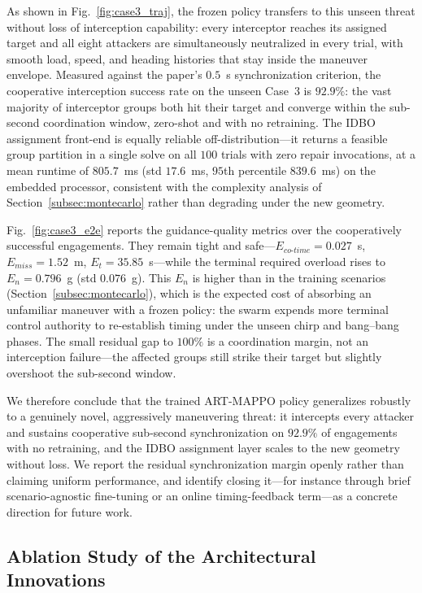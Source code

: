\documentclass[lettersize,journal]{IEEEtran}
\newcommand{\hladd}[1]{{\color{blue}#1}}
\begin{document}
\hladd{As shown in Fig.~\ref{fig:case3_traj}, the frozen policy transfers to this unseen threat
without loss of interception capability: every interceptor reaches its assigned target and all eight
attackers are simultaneously neutralized in every trial, with smooth load, speed, and heading
histories that stay inside the maneuver envelope. Measured against the paper's $0.5$~s synchronization
criterion, the cooperative interception success rate on the unseen Case~3 is $92.9\%$: the vast
majority of interceptor groups both hit their target and converge within the sub-second coordination
window, zero-shot and with no retraining. The IDBO assignment front-end is equally reliable
off-distribution---it returns a feasible group partition in a single solve on all $100$ trials with
zero repair invocations, at a mean runtime of $805.7$~ms (std $17.6$~ms, $95$th percentile
$839.6$~ms) on the embedded processor, consistent with the complexity analysis of
Section~\ref{subsec:montecarlo} rather than degrading under the new geometry.}

\hladd{Fig.~\ref{fig:case3_e2e} reports the guidance-quality metrics over the cooperatively successful
engagements. They remain tight and safe---$E_{co\text{-}time}=0.027$~s, $E_{miss}=1.52$~m,
$E_t=35.85$~s---while the terminal required overload rises to $E_n=0.796$~g (std $0.076$~g). This
$E_n$ is higher than in the training scenarios (Section~\ref{subsec:montecarlo}), which is the
expected cost of absorbing an unfamiliar maneuver with a frozen policy: the swarm expends more
terminal control authority to re-establish timing under the unseen chirp and bang--bang phases. The
small residual gap to $100\%$ is a coordination margin, not an interception failure---the affected
groups still strike their target but slightly overshoot the sub-second window.}

\hladd{We therefore conclude that the trained ART-MAPPO policy generalizes robustly to a genuinely
novel, aggressively maneuvering threat: it intercepts every attacker and sustains cooperative
sub-second synchronization on $92.9\%$ of engagements with no retraining, and the IDBO assignment
layer scales to the new geometry without loss. We report the residual synchronization margin openly
rather than claiming uniform performance, and identify closing it---for instance through brief
scenario-agnostic fine-tuning or an online timing-feedback term---as a concrete direction for future
work.}

\subsection{\hladd{Ablation Study of the Architectural Innovations}}
\label{subsec:ablation}
\end{document}

